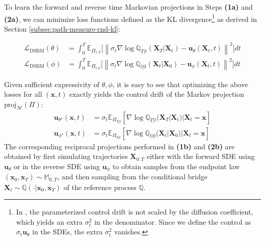 \documentclass{article}
\begin{document}
To learn the forward and reverse time Markovian projections in Steps \textbf{(1a)} and \textbf{(2a)}, we can minimize loss functions defined as the KL divergence\footnote{In \citet{shi2023diffusion}, the parameterized control drift is not scaled by the diffusion coefficient, which yields an extra $\sigma_t^2$ in the denominator. Since we define the control as $\sigma_t\boldsymbol{u}_\theta$ in the SDEs, the extra $\sigma_t^2$ vanishes.} as derived in Section \ref{subsec:path-measure-rnd-kl}:
\begin{small}
\begin{align}
    \mathcal{L}_{\text{DSBM}}(\theta)&=\int_0^T\mathbb{E}_{\Pi_{t,T}}\bigg[\left\|\sigma_t\nabla\log \mathbb{Q}_{T|t}(\boldsymbol{X}_T|\boldsymbol{X}_t)-\boldsymbol{u}_\theta(\boldsymbol{X}_t,t)\right\|^2\bigg]dt\tag{Forward DSBM Loss}\label{eq:dsbm-loss-theta}\\
    \mathcal{L}_{\text{DSBM}}(\phi)&=\int_0^T\mathbb{E}_{\Pi_{t,0}}\bigg[\left\|\sigma_t\nabla  \log \mathbb{Q}_{t|0}(\boldsymbol{X}_t|\boldsymbol{X}_0)-\boldsymbol{u}_\phi(\boldsymbol{X}_t,t)\right\|^2\bigg]dt\tag{Reverse DSBM Loss}\label{eq:dsbm-loss-phi}
\end{align}
\end{small}
Given sufficient expressivity of $\theta, \phi$, it is easy to see that optimizing the above losses for all $(\boldsymbol{x},t)$ exactly yields the control drift of the Markov projection $\text{proj}_{\mathcal{M}}(\Pi)$:
\begin{align}
    \boldsymbol{u}_{\theta^\star}(\boldsymbol{x},t)&=\sigma_t\mathbb{E}_{\Pi_{T|t}}\left[\nabla  \log \mathbb{Q}_{T|t}(\boldsymbol{X}_T|\boldsymbol{X}_t)|\boldsymbol{X}_t=\boldsymbol{x}\right]\\
    \boldsymbol{u}_{\phi^\star}(\boldsymbol{x},t)&=\sigma_t\mathbb{E}_{\Pi_{0|t}}\left[\nabla  \log \mathbb{Q}_{t|0}(\boldsymbol{X}_t|\boldsymbol{X}_0)|\boldsymbol{X}_t=\boldsymbol{x}\right]
\end{align}
The corresponding reciprocal projections performed in \textbf{(1b)} and \textbf{(2b)} are obtained by first simulating trajectories $\boldsymbol{X}_{0:T}$ either with the forward SDE using $\boldsymbol{u}_\theta$ or in the reverse SDE using $\boldsymbol{u}_\phi$ to obtain samples from the endpoint law $(\boldsymbol{x}_0, \boldsymbol{x}_T) \sim \mathbb{M}_{0,T}$, and then sampling from the conditional bridge $\boldsymbol{X}_t\sim\mathbb{Q}(\cdot|\boldsymbol{x}_0, \boldsymbol{x}_T)$ of the reference process $\mathbb{Q}$.
\end{document}
